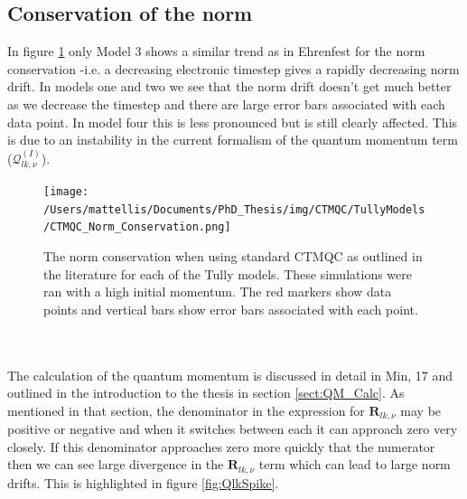 \subsection{Conservation of the norm}
In figure \ref{fig:CTMQCNormCons} only Model 3 shows a similar trend as in Ehrenfest for the norm conservation -i.e. a decreasing electronic timestep gives a rapidly decreasing norm drift. In models one and two we see that the norm drift doesn't get much better as we decrease the timestep and there are large error bars associated with each data point. In model four this is less pronounced but is still clearly affected. This is due to an instability in the current formalism of the quantum momentum term ($\mathcal{Q}_{lk, \nu}^{(I)}$).
\begin{figure}[ht]
	\texttt{[image: /Users/mattellis/Documents/PhD\_Thesis/img/CTMQC/TullyModels/CTMQC\_Norm\_Conservation.png]}
	\caption{\label{fig:CTMQCNormCons}The norm conservation when using standard CTMQC as outlined in the literature for each of the Tully models. These simulations were ran with a high initial momentum. The red markers show data points and vertical bars show error bars associated with each point.}
\end{figure}
\\\\
The calculation of the quantum momentum is discussed in detail in Min, 17 \cite{min_ab_2017} and outlined in the introduction to the thesis in section \ref{sect:QM_Calc}. As mentioned in that section, the denominator in the expression for $\mathbf{R}_{lk, \nu}$ may be positive or negative and when it switches between each it can approach zero very closely. If this denominator approaches zero more quickly that the numerator then we can see large divergence in the $\mathbf{R}_{lk, \nu}$ term which can lead to large norm drifts. This is highlighted in figure \ref{fig:QlkSpike}.

